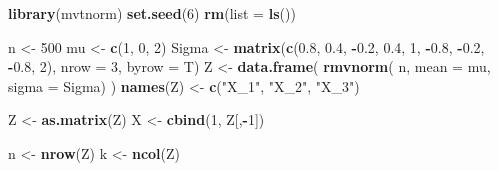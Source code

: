 \documentclass[
]{article}
\newenvironment{Shaded}{\begin{snugshade}}{\end{snugshade}}
\newcommand{\AttributeTok}[1]{\textcolor[rgb]{0.13,0.29,0.53}{#1}}
\newcommand{\DecValTok}[1]{\textcolor[rgb]{0.00,0.00,0.81}{#1}}
\newcommand{\FloatTok}[1]{\textcolor[rgb]{0.00,0.00,0.81}{#1}}
\newcommand{\FunctionTok}[1]{\textcolor[rgb]{0.13,0.29,0.53}{\textbf{#1}}}
\newcommand{\NormalTok}[1]{#1}
\newcommand{\OtherTok}[1]{\textcolor[rgb]{0.56,0.35,0.01}{#1}}
\newcommand{\SpecialCharTok}[1]{\textcolor[rgb]{0.81,0.36,0.00}{\textbf{#1}}}
\newcommand{\StringTok}[1]{\textcolor[rgb]{0.31,0.60,0.02}{#1}}
\begin{document}
\begin{Shaded}
\begin{Highlighting}[]
\FunctionTok{library}\NormalTok{(mvtnorm)}
\FunctionTok{set.seed}\NormalTok{(}\DecValTok{6}\NormalTok{)}
\FunctionTok{rm}\NormalTok{(}\AttributeTok{list =} \FunctionTok{ls}\NormalTok{())}

\NormalTok{n }\OtherTok{\textless{}{-}} \DecValTok{500}
\NormalTok{mu }\OtherTok{\textless{}{-}} \FunctionTok{c}\NormalTok{(}\DecValTok{1}\NormalTok{, }\DecValTok{0}\NormalTok{, }\DecValTok{2}\NormalTok{)}
\NormalTok{Sigma }\OtherTok{\textless{}{-}} \FunctionTok{matrix}\NormalTok{(}\FunctionTok{c}\NormalTok{(}\FloatTok{0.8}\NormalTok{, }\FloatTok{0.4}\NormalTok{, }\SpecialCharTok{{-}}\FloatTok{0.2}\NormalTok{,}
                  \FloatTok{0.4}\NormalTok{, }\DecValTok{1}\NormalTok{, }\SpecialCharTok{{-}}\FloatTok{0.8}\NormalTok{,}
                  \SpecialCharTok{{-}}\FloatTok{0.2}\NormalTok{, }\SpecialCharTok{{-}}\FloatTok{0.8}\NormalTok{, }\DecValTok{2}\NormalTok{),}
                \AttributeTok{nrow =} \DecValTok{3}\NormalTok{,}
                \AttributeTok{byrow =}\NormalTok{ T)}
\NormalTok{Z }\OtherTok{\textless{}{-}} \FunctionTok{data.frame}\NormalTok{(}
  \FunctionTok{rmvnorm}\NormalTok{(}
\NormalTok{    n,}
    \AttributeTok{mean =}\NormalTok{ mu,}
    \AttributeTok{sigma =}\NormalTok{ Sigma)}
\NormalTok{  )}
\FunctionTok{names}\NormalTok{(Z) }\OtherTok{\textless{}{-}} \FunctionTok{c}\NormalTok{(}\StringTok{"X\_1"}\NormalTok{, }\StringTok{"X\_2"}\NormalTok{, }\StringTok{"X\_3"}\NormalTok{)}

\NormalTok{Z }\OtherTok{\textless{}{-}} \FunctionTok{as.matrix}\NormalTok{(Z)}
\NormalTok{X }\OtherTok{\textless{}{-}} \FunctionTok{cbind}\NormalTok{(}\DecValTok{1}\NormalTok{, Z[,}\SpecialCharTok{{-}}\DecValTok{1}\NormalTok{])}

\NormalTok{n }\OtherTok{\textless{}{-}} \FunctionTok{nrow}\NormalTok{(Z)}
\NormalTok{k }\OtherTok{\textless{}{-}} \FunctionTok{ncol}\NormalTok{(Z)}
\end{Highlighting}
\end{Shaded}

\onehalfspacing
\end{document}
